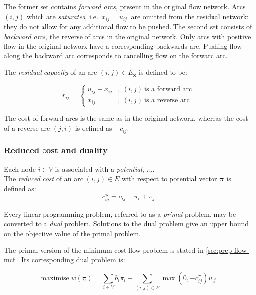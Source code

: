 The former set contains \emph{forward arcs}, present in the original flow network. Arcs $(i,j)$ which are \emph{saturated}, i.e.\ $x_{ij}=u_{ij}$, are omitted from the residual network: they do not allow for any additional flow to be pushed. The second set consists of \emph{backward arcs}, the reverse of arcs in the original network. Only arcs with positive flow in the original network have a corresponding backwards arc. Pushing flow along the backward arc corresponds to cancelling flow on the forward arc.

The \emph{residual capacity} of an arc $(i,j)\in E_{\mathbf{x}}$ is defined to be:

\begin{equation}
r_{ij}=\begin{cases}
u_{ij}-x_{ij} & ,\:(i,j)\:\mbox{is a forward arc}\\
x_{ij} & ,\:(i,j)\:\mbox{is a reverse arc}
\end{cases}
\end{equation}

The cost of forward arcs is the same as in the original network, whereas the cost of a reverse arc $(j,i)$ is defined as $-c_{ij}$.

\subsubsection{Reduced cost and duality} \label{sec:prep-flow-rc-and-dual}


Each node $i\in V$ is associated with a \emph{potential}, $\pi_{i}$.\\

The \emph{reduced cost} of an arc $(i,j)\in E$ with respect to potential vector $\boldsymbol{\pi}$ is defined as:
\begin{equation} \label{eq:reduced-costs}
c_{ij}^{\boldsymbol{\pi}}=c_{ij}-\pi_{i}+\pi_{j}
\end{equation}

Every linear programming problem, referred to as a \emph{primal} problem, may be converted to a \emph{dual} problem. Solutions to the dual problem give an upper bound on the objective value of the primal problem.

The primal version of the minimum-cost flow problem is stated in \cref{sec:prep-flow-mcf}. Its corresponding dual problem is:

\begin{equation}
\mathrm{maximise}\; w(\boldsymbol{\pi})=\sum_{i\in V}b_{i}\pi_{i}-\sum_{(i,j)\in E}\max\left(0,-c_{ij}^{\pi}\right)u_{ij}
\end{equation}


